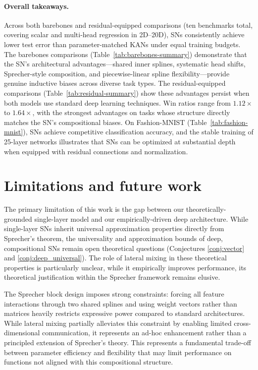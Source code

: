 \documentclass{article}
\theoremstyle{plain}
\theoremstyle{definition}
\theoremstyle{remark}
\begin{document}
\paragraph{Overall takeaways.}
Across both barebones and residual-equipped comparisons (ten benchmarks total, covering scalar and multi-head regression in 2D--20D), SNs consistently achieve lower test error than parameter-matched KANs under equal training budgets. The barebones comparisons (Table~\ref{tab:barebones-summary}) demonstrate that the SN's architectural advantages---shared inner splines, systematic head shifts, Sprecher-style composition, and piecewise-linear spline flexibility---provide genuine inductive biases across diverse task types. The residual-equipped comparisons (Table~\ref{tab:residual-summary}) show these advantages persist when both models use standard deep learning techniques. Win ratios range from $1.12\times$ to $1.64\times$, with the strongest advantages on tasks whose structure directly matches the SN's compositional biases. On Fashion-MNIST (Table~\ref{tab:fashion-mnist}), SNs achieve competitive classification accuracy, and the stable training of 25-layer networks illustrates that SNs can be optimized at substantial depth when equipped with residual connections and normalization.

\section{Limitations and future work}
The primary limitation of this work is the gap between our theoretically-grounded single-layer model and our empirically-driven deep architecture. While single-layer SNs inherit universal approximation properties directly from Sprecher's theorem, the universality and approximation bounds of deep, compositional SNs remain open theoretical questions (Conjectures \ref{conj:vector} and \ref{conj:deep_universal}). The role of lateral mixing in these theoretical properties is particularly unclear, while it empirically improves performance, its theoretical justification within the Sprecher framework remains elusive.

The Sprecher block design imposes strong constraints: forcing all feature interactions through two shared splines and using weight vectors rather than matrices heavily restricts expressive power compared to standard architectures. While lateral mixing partially alleviates this constraint by enabling limited cross-dimensional communication, it represents an ad-hoc enhancement rather than a principled extension of Sprecher's theory. This represents a fundamental trade-off between parameter efficiency and flexibility that may limit performance on functions not aligned with this compositional structure.
\end{document}
